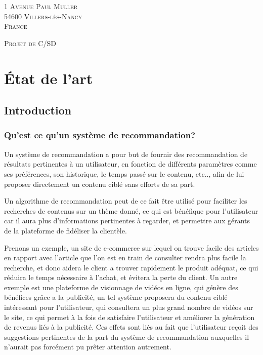 \documentclass{report}
\begin{document}
\begin{titlepage}
\begin{flushright}
        {\scshape
        1 Avenue Paul Muller\\
        54600 Villers-lès-Nancy\\
        France}
        \end{flushright}
        \vspace*{-1cm}
        \begin{flushleft}
        {\scshape Projet de C/SD}
        \end{flushleft}
\end{titlepage}

\newpage
\tableofcontents
\chapter{État de l'art}
\section{Introduction}
\subsection{Qu'est ce qu'un système de recommandation?}
Un système de recommandation a pour but de fournir des recommandation de résultats pertinentes à un utilisateur, en fonction de différents paramètres comme ses préférences, son historique, le temps passé sur le contenu, etc.., afin de lui proposer directement un contenu ciblé sans efforts de sa part.

Un algorithme de recommandation peut de ce fait être utilisé pour faciliter les recherches de contenus sur un thème donné, ce qui est bénéfique pour l'utilisateur car il aura plus d'informations pertinentes à regarder, et permettre aux gérants de la plateforme de fidéliser la clientèle.\par

Prenons un exemple, un site de e-commerce sur lequel on trouve facile des articles en rapport avec l'article que l'on est en train de consulter rendra plus facile la recherche, et donc aidera le client a trouver rapidement le produit adéquat, ce qui réduira le temps nécessaire à l'achat, et évitera la perte du client.
Un autre exemple est une plateforme de visionnage de vidéos en ligne, qui génère des bénéfices grâce a la publicité, un tel système proposera du contenu ciblé intéressant pour l'utilisateur, qui consultera un plus grand nombre de vidéos sur le site, ce qui permet à la fois de satisfaire l'utilisateur et améliorer la génération de revenus liés à la publicité.
Ces effets sont liés au fait que l'utilisateur reçoit des suggestions pertinentes de la part du système de recommandation auxquelles il n'aurait pas forcément pu prêter attention autrement.\par
\end{document}
